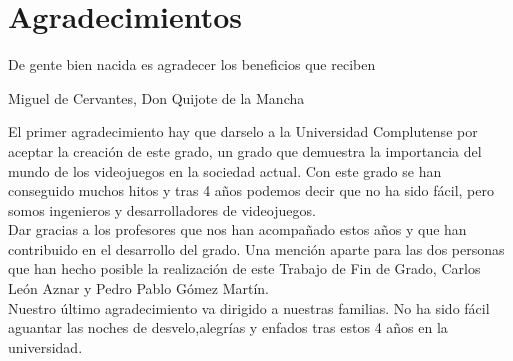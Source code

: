 %
%
%
%
%
%
%
%
%
%
%
%
%

\chapter{Agradecimientos}


\begin{FraseCelebre}
\begin{Frase}
De gente bien nacida es agradecer los beneficios que reciben 
\end{Frase}
\begin{Fuente}
Miguel de Cervantes, Don Quijote de la Mancha
\end{Fuente}
\end{FraseCelebre}

El primer agradecimiento hay que darselo a la Universidad Complutense por aceptar la creaci\'on de este grado, un grado que demuestra la importancia del mundo de los videojuegos en la sociedad actual. Con este grado se han conseguido muchos hitos y tras 4 a\~nos podemos decir que no ha sido f\'acil, pero somos ingenieros y desarrolladores de videojuegos.
\\
Dar gracias a los profesores que nos han acompa\~nado estos a\~nos y que han contribuido en el desarrollo del grado. Una menci\'on aparte para las dos personas que han hecho posible la realizaci\'on de este Trabajo de Fin de Grado, Carlos Le\'on Aznar y Pedro Pablo G\'omez Mart\'in.
\\
Nuestro \'ultimo  agradecimiento va dirigido a nuestras familias. No ha sido f\'acil aguantar las noches de desvelo,alegr\'ias y enfados tras estos 4 a\~nos en la universidad.
\\

\endinput
